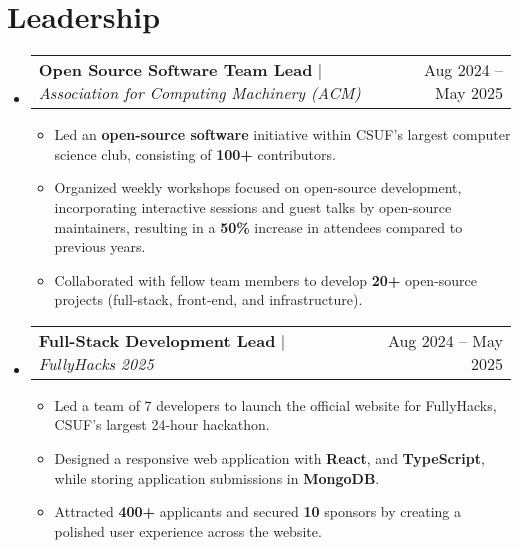 \documentclass[letterpaper,11pt]{article}
\makeatletter
\newcommand{\resumeItem}[1]{
  \item\small{
    {#1 \vspace{-2pt}}
  }
}
\newcommand{\resumeProjectHeading}[2]{
  \item
  \begin{tabular*}{1\textwidth}{l@{\extracolsep{\fill}}r}
    \small#1 & #2 \\
  \end{tabular*}\vspace{-7pt}
}
\newcommand{\resumeSubHeadingListStart}{\begin{itemize}[leftmargin=0in, label={}]}
\newcommand{\resumeSubHeadingListEnd}{\end{itemize}}
\newcommand{\resumeItemListStart}{\begin{itemize}[leftmargin=0.25in]}
\newcommand{\resumeItemListEnd}{\end{itemize}\vspace{-5pt}}
\makeatother
\begin{document}
\section{Leadership}
\resumeSubHeadingListStart

\resumeProjectHeading
{\textbf{Open Source Software Team Lead} $|$
  \footnotesize\emph{Association for Computing Machinery (ACM)}}{Aug 2024 -- May 2025}
\resumeItemListStart
\resumeItem{Led an \textbf{open-source software} initiative within CSUF's largest computer science club, consisting of \textbf{100+} contributors.}
\resumeItem{Organized weekly workshops focused on open-source development, incorporating interactive sessions and guest talks by open-source maintainers, resulting in a \textbf{50\%} increase in attendees compared to previous years.}
\resumeItem{Collaborated with fellow team members to develop \textbf{20+} open-source projects (full-stack, front-end, and infrastructure).}
\resumeItemListEnd

\resumeProjectHeading
{\textbf{Full-Stack Development Lead} $|$
  \footnotesize\emph{FullyHacks 2025}}{Aug 2024 -- May 2025}
\resumeItemListStart
\resumeItem{Led a team of 7 developers to launch the official website for FullyHacks, CSUF's largest 24-hour hackathon.}
\resumeItem{Designed a responsive web application with \textbf{React}, and \textbf{TypeScript}, while storing application submissions in \textbf{MongoDB}.}
\resumeItem{Attracted \textbf{400+} applicants and secured \textbf{10} sponsors by creating a polished user experience across the website.}
\resumeItemListEnd

\resumeSubHeadingListEnd
\end{document}
